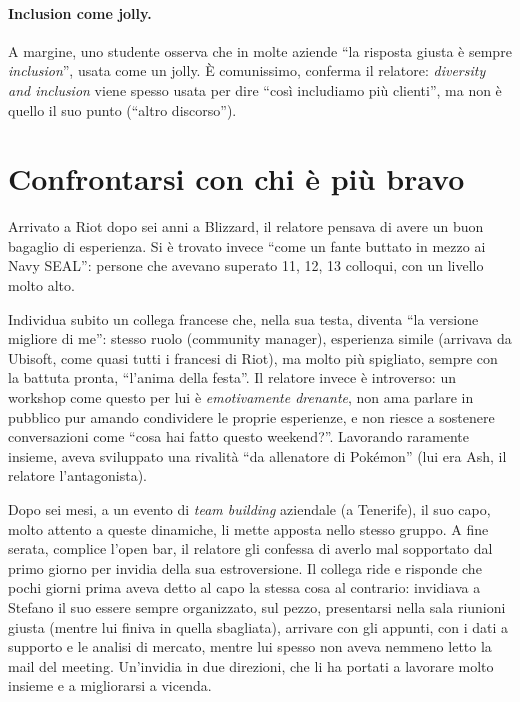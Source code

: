 \paragraph{Inclusion come jolly.} A margine, uno studente osserva che in molte
aziende ``la risposta giusta è sempre \emph{inclusion}'', usata come un
jolly. È comunissimo, conferma il relatore: \emph{diversity and inclusion}
viene spesso usata per dire ``così includiamo più clienti'', ma non è quello
il suo punto (``altro discorso'').

\section{Confrontarsi con chi è più bravo}
\label{sec:z1-rivalita}

Arrivato a Riot dopo sei anni a Blizzard, il relatore pensava di avere un buon
bagaglio di esperienza. Si è trovato invece ``come un fante buttato in mezzo
ai Navy SEAL'': persone che avevano superato 11, 12, 13 colloqui, con un
livello molto alto.

Individua subito un collega francese che, nella sua testa, diventa ``la
versione migliore di me'': stesso ruolo (community manager), esperienza
simile (arrivava da Ubisoft, come quasi tutti i francesi di Riot), ma molto
più spigliato, sempre con la battuta pronta, ``l'anima della festa''. Il
relatore invece è introverso: un workshop come questo per lui è
\emph{emotivamente drenante}, non ama parlare in pubblico pur amando
condividere le proprie esperienze, e non riesce a sostenere conversazioni
come ``cosa hai fatto questo weekend?''. Lavorando raramente insieme, aveva
sviluppato una rivalità ``da allenatore di Pokémon'' (lui era Ash, il
relatore l'antagonista).

Dopo sei mesi, a un evento di \emph{team building} aziendale (a Tenerife), il
suo capo, molto attento a queste dinamiche, li mette apposta nello stesso
gruppo. A fine serata, complice l'open bar, il relatore gli confessa di averlo
mal sopportato dal primo giorno per invidia della sua estroversione. Il
collega ride e risponde che pochi giorni prima aveva detto al capo la stessa
cosa al contrario: invidiava a Stefano il suo essere sempre organizzato, sul
pezzo, presentarsi nella sala riunioni giusta (mentre lui finiva in quella
sbagliata), arrivare con gli appunti, con i dati a supporto e le analisi di
mercato, mentre lui spesso non aveva nemmeno letto la mail del meeting.
Un'invidia in due direzioni, che li ha portati a lavorare molto insieme e a
migliorarsi a vicenda.


